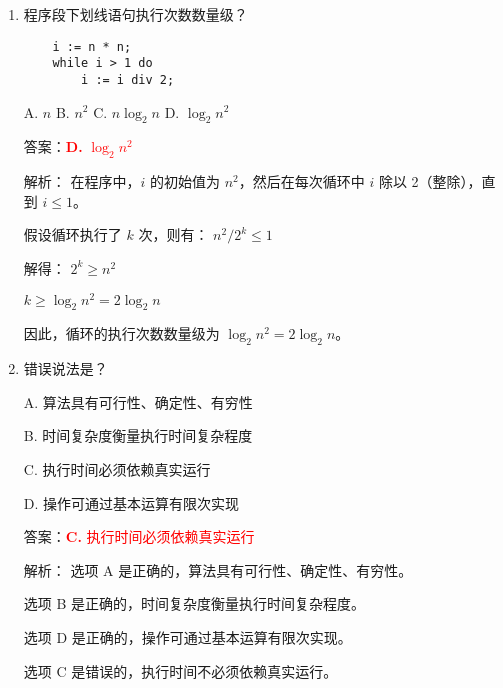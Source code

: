 \documentclass[lang=cn,newtx,10pt,scheme=chinese]{../../../elegantbook}
\begin{document}
\begin{enumerate}
    \item 程序段下划线语句执行次数数量级？
    \begin{verbatim}
    i := n * n;
    while i > 1 do
        i := i div 2;
    \end{verbatim}
    A. $n$ \quad B. ${n^2}$ \quad C. $n\log_2 n$ \quad D. $\log_2 n^2$

    答案：\textcolor{red}{\textbf{D.} $\log_2 n^2$}

    解析：
    在程序中，$i$ 的初始值为 $n^2$，然后在每次循环中 $i$ 除以 2（整除），直到 $i \leq 1$。
    
    假设循环执行了 $k$ 次，则有：
    $n^2 / 2^k \leq 1$
    
    解得：
    $2^k \geq n^2$
    
    $k \geq \log_2 n^2 = 2\log_2 n$
    
    因此，循环的执行次数数量级为 $\log_2 n^2 = 2\log_2 n$。

    \item 错误说法是？\
   
    A. 算法具有可行性、确定性、有穷性 \

    B. 时间复杂度衡量执行时间复杂程度 \

    C. 执行时间必须依赖真实运行 \

    D. 操作可通过基本运算有限次实现

    答案：\textcolor{red}{\textbf{C.} 执行时间必须依赖真实运行}

    解析：
    选项 A 是正确的，算法具有可行性、确定性、有穷性。

    选项 B 是正确的，时间复杂度衡量执行时间复杂程度。

    选项 D 是正确的，操作可通过基本运算有限次实现。
    
    选项 C 是错误的，执行时间不必须依赖真实运行。

\end{enumerate}
\end{document}
